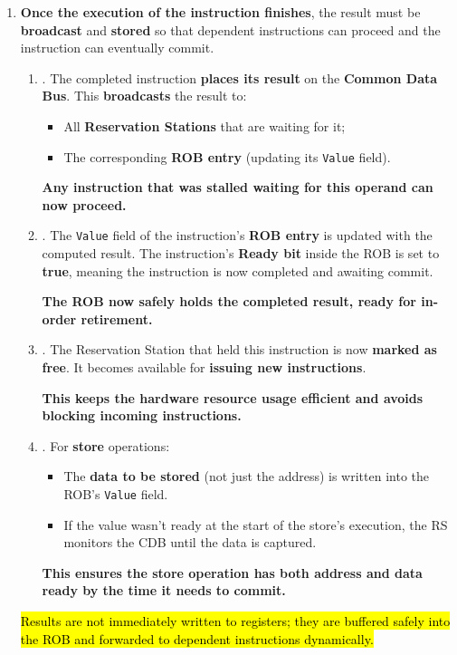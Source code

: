 \begin{enumerate}
    \item {}
    
    \textbf{Once the execution of the instruction finishes}, the result must be \textbf{broadcast} and \textbf{stored} so that dependent instructions can proceed and the instruction can eventually commit.
    \begin{enumerate}
        \item {}.  The completed instruction \textbf{places its result} on the \textbf{Common Data Bus}. This \textbf{broadcasts} the result to:
        \begin{itemize}
            \item All \textbf{Reservation Stations} that are waiting for it;
            \item The corresponding \textbf{ROB entry} (updating its \texttt{Value} field).
        \end{itemize}
        \textcolor{Green3}{\faIcon{\speedIcon} \textbf{Any instruction that was stalled waiting for this operand can now proceed.}}

        \item {}. The \texttt{Value} field of the instruction's \textbf{ROB entry} is updated with the computed result. The instruction's \textbf{Ready bit} inside the ROB is set to \textbf{true}, meaning the instruction is now completed and awaiting commit.
        
        \textcolor{Green3}{\faIcon{\speedIcon} \textbf{The ROB now safely holds the completed result, ready for in-order retirement.}}
        
        \item {}. The Reservation Station that held this instruction is now \textbf{marked as free}. It becomes available for \textbf{issuing new instructions}.

        \textcolor{Green3}{\faIcon{\speedIcon} \textbf{This keeps the hardware resource usage efficient and avoids blocking incoming instructions.}}
        
        \item {}. For \textbf{store} operations:
        \begin{itemize}
            \item The \textbf{data to be stored} (not just the address) is written into the ROB's \texttt{Value} field.
            \item If the value wasn't ready at the start of the store's execution, the RS monitors the CDB until the data is captured.
        \end{itemize}
        \textcolor{Green3}{\faIcon{\speedIcon} \textbf{This ensures the store operation has both address and data ready by the time it needs to commit.}}
    \end{enumerate}
    \hl{Results are not immediately written to registers; they are buffered safely into the ROB and forwarded to dependent instructions dynamically.}


\end{enumerate}
